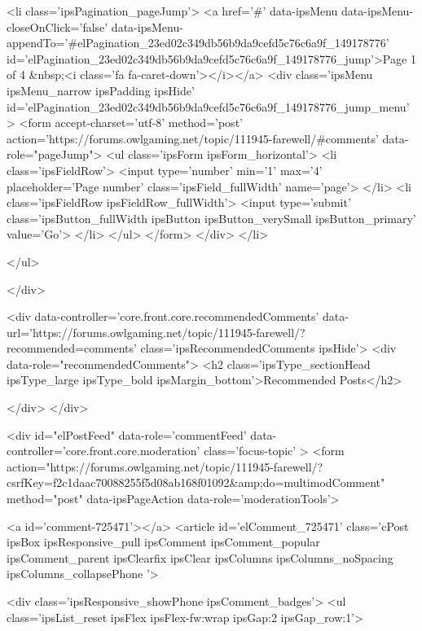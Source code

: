 			
				<li class='ipsPagination_pageJump'>
					<a href='#' data-ipsMenu data-ipsMenu-closeOnClick='false' data-ipsMenu-appendTo='#elPagination_23ed02c349db56b9da9cefd5c76c6a9f_149178776' id='elPagination_23ed02c349db56b9da9cefd5c76c6a9f_149178776_jump'>Page 1 of 4 &nbsp;<i class='fa fa-caret-down'></i></a>
					<div class='ipsMenu ipsMenu_narrow ipsPadding ipsHide' id='elPagination_23ed02c349db56b9da9cefd5c76c6a9f_149178776_jump_menu'>
						<form accept-charset='utf-8' method='post' action='https://forums.owlgaming.net/topic/111945-farewell/#comments' data-role="pageJump">
							<ul class='ipsForm ipsForm_horizontal'>
								<li class='ipsFieldRow'>
									<input type='number' min='1' max='4' placeholder='Page number' class='ipsField_fullWidth' name='page'>
								</li>
								<li class='ipsFieldRow ipsFieldRow_fullWidth'>
									<input type='submit' class='ipsButton_fullWidth ipsButton ipsButton_verySmall ipsButton_primary' value='Go'>
								</li>
							</ul>
						</form>
					</div>
				</li>
			
		
	</ul>

					
				</div>
			
	

	

<div data-controller='core.front.core.recommendedComments' data-url='https://forums.owlgaming.net/topic/111945-farewell/?recommended=comments' class='ipsRecommendedComments ipsHide'>
	<div data-role="recommendedComments">
		<h2 class='ipsType_sectionHead ipsType_large ipsType_bold ipsMargin_bottom'>Recommended Posts</h2>
		
	</div>
</div>
	
	<div id="elPostFeed" data-role='commentFeed' data-controller='core.front.core.moderation' class='focus-topic' >
		<form action="https://forums.owlgaming.net/topic/111945-farewell/?csrfKey=f2c1daac70088255f5d08ab168f01092&amp;do=multimodComment" method="post" data-ipsPageAction data-role='moderationTools'>
			
			
				
					
					
					



<a id='comment-725471'></a>
<article  id='elComment_725471' class='cPost ipsBox ipsResponsive_pull  ipsComment ipsComment_popular ipsComment_parent ipsClearfix ipsClear ipsColumns ipsColumns_noSpacing ipsColumns_collapsePhone    '>
	

	
		<div class='ipsResponsive_showPhone ipsComment_badges'>
			<ul class='ipsList_reset ipsFlex ipsFlex-fw:wrap ipsGap:2 ipsGap_row:1'>
				
